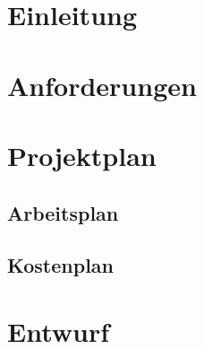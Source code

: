 \documentclass[12pt,			%
a4paper,						%
twoside, 						%
listof=totoc, 					%
bibliography=totoc,				%
titlepage, 						%
headsepline, 					%
DIV18,							%
BCOR6mm,						%
cleardoublepage=empty,			%
parskip,						%
ngerman							%
]{scrbook}
\begin{document}
\setcounter{secnumdepth}{3}				%
\setcounter{tocdepth}{3}
\sffamily								%





\tableofcontents						%
\cleardoublepage


\rmfamily

\chapter{Einleitung}
\setcounter{chapter}{1}


\chapter{Anforderungen}
\setcounter{chapter}{2}


\chapter{Projektplan}

\section{Arbeitsplan}

\section{Kostenplan}


\chapter{Entwurf}

\end{document}
